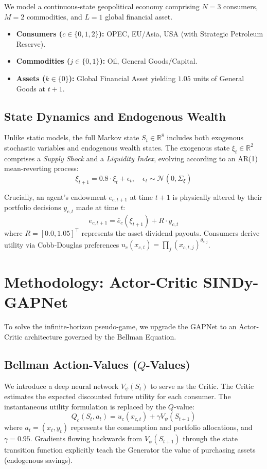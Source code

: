 \documentclass[11pt, a4paper]{article}
\begin{document}
We model a continuous-state geopolitical economy comprising $N=3$ consumers, $M=2$ commodities, and $L=1$ global financial asset. 
\begin{itemize}
    \item \textbf{Consumers ($c \in \{0,1,2\}$):} OPEC, EU/Asia, USA (with Strategic Petroleum Reserve).
    \item \textbf{Commodities ($j \in \{0,1\}$):} Oil, General Goods/Capital.
    \item \textbf{Assets ($k \in \{0\}$):} Global Financial Asset yielding $1.05$ units of General Goods at $t+1$.
\end{itemize}

\subsection{State Dynamics and Endogenous Wealth}
Unlike static models, the full Markov state $S_t \in \mathbb{R}^8$ includes both exogenous stochastic variables and endogenous wealth states. The exogenous state $\xi_t \in \mathbb{R}^2$ comprises a \textit{Supply Shock} and a \textit{Liquidity Index}, evolving according to an AR(1) mean-reverting process:
\begin{equation}
    \xi_{t+1} = 0.8 \cdot \xi_t + \epsilon_t, \quad \epsilon_t \sim \mathcal{N}(0, \Sigma_\xi)
\end{equation}

Crucially, an agent's endowment $e_{c, t+1}$ at time $t+1$ is physically altered by their portfolio decisions $y_{c, t}$ made at time $t$:
\begin{equation}
    e_{c, t+1} = \bar{e}_c(\xi_{t+1}) + R \cdot y_{c, t}
\end{equation}
where $R = [0.0, 1.05]^\top$ represents the asset dividend payouts. Consumers derive utility via Cobb-Douglas preferences $u_c(x_{c,t}) = \prod_j (x_{c,t,j})^{\theta_{c,j}}$.

\section{Methodology: Actor-Critic SINDy-GAPNet}

To solve the infinite-horizon pseudo-game, we upgrade the GAPNet to an Actor-Critic architecture governed by the Bellman Equation.

\subsection{Bellman Action-Values ($Q$-Values)}
We introduce a deep neural network $V_\psi(S_t)$ to serve as the Critic. The Critic estimates the expected discounted future utility for each consumer. The instantaneous utility formulation is replaced by the $Q$-value:
\begin{equation}\label{eq:q_value}
    Q_c(S_t, a_t) = u_c(x_{c,t}) + \gamma V_\psi(S_{t+1})
\end{equation}
where $a_t = (x_t, y_t)$ represents the consumption and portfolio allocations, and $\gamma = 0.95$. Gradients flowing backwards from $V_\psi(S_{t+1})$ through the state transition function explicitly teach the Generator the value of purchasing assets (endogenous savings).
\end{document}
